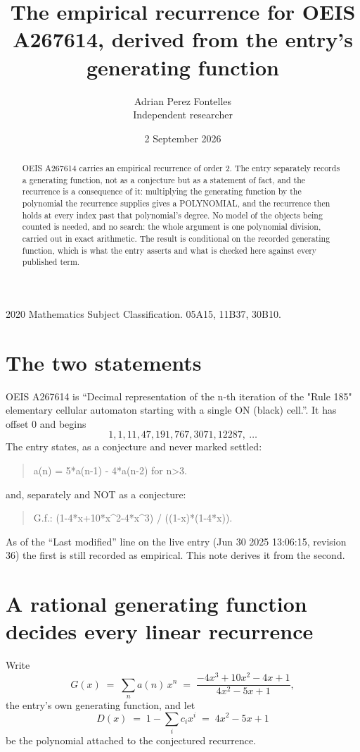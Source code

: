 \documentclass[11pt,a4paper]{article}
\title{The empirical recurrence for OEIS A267614, derived from the entry's generating function}
\author{Adrian Perez Fontelles\\ \small Independent researcher}
\date{2 September 2026}
\theoremstyle{plain}
\theoremstyle{definition}
\begin{document}
\maketitle

\begin{abstract}
OEIS A267614 carries an empirical recurrence of order $2$. The entry separately records a
generating function, not as a conjecture but as a statement of fact, and the recurrence is a
consequence of it: multiplying the generating function by the polynomial the recurrence
supplies gives a POLYNOMIAL, and the recurrence then holds at every index past that
polynomial's degree. No model of the objects being counted is needed, and no search: the
whole argument is one polynomial division, carried out in exact arithmetic. The result is
conditional on the recorded generating function, which is what the entry asserts and what is
checked here against every published term.
\end{abstract}

\noindent\small 2020 Mathematics Subject Classification. 05A15, 11B37, 30B10.\normalsize

\section{The two statements}

OEIS A267614 is ``Decimal representation of the n-th iteration of the "Rule 185" elementary cellular automaton starting with a single ON (black) cell.''. It has offset $0$ and begins
\[
1, 1, 11, 47, 191, 767, 3071, 12287,\ \dots
\]
The entry states, as a conjecture and never marked settled:
\begin{quote}
a(n) = 5*a(n-1) - 4*a(n-2) for n>3.
\end{quote}
and, separately and NOT as a conjecture:
\begin{quote}
G.f.: (1-4*x+10*x\^{}2-4*x\^{}3) / ((1-x)*(1-4*x)).
\end{quote}
As of the ``Last modified'' line on the live entry (Jun 30 2025 13:06:15, revision 36) the first is still
recorded as empirical. This note derives it from the second.

\section{A rational generating function decides every linear recurrence}

Write
\[
G(x)\;=\;\sum_{n}a(n)\,x^{n}\;=\;\frac{- 4 x^{3} + 10 x^{2} - 4 x + 1}{4 x^{2} - 5 x + 1},
\]
the entry's own generating function, and let
\[
D(x)\;=\;1-\sum_i c_i x^{i}\;=\;4 x^{2} - 5 x + 1
\]
be the polynomial attached to the conjectured recurrence.
\end{document}
